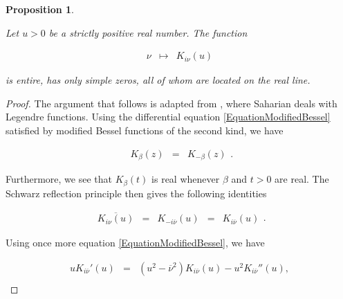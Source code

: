 \documentclass{jams-l}
\newtheorem{proposition}[theorem]{Proposition}
\theoremstyle{definition}
\theoremstyle{remark}
\numberwithin{equation}{section}
\begin{document}
        \begin{proposition}
        \label{PropAppZerosModifiedBessel}
        
            Let $u > 0$ be a strictly positive real number. The function
            
            \[ \begin{array}{lll}
                    \nu & \longmapsto & K_{i \nu} \left( u \right)
                \end{array} \]
            
            \noindent is entire, has only simple zeros, all of whom are located on the real line.
        
        \end{proposition}
        
        \begin{proof}
        
            The argument that follows is adapted from \cite[Appendix A]{MR2439244}, where Saharian deals with  Legendre functions. Using the differential equation \ref{EquationModifiedBessel} satisfied by modified Bessel functions of the second kind, we have
            
            \[ \begin{array}{lll}
                    K_{\beta} \left( z \right) & = & K_{- \beta} \left( z \right)
                \end{array} . \]
            
            \noindent Furthermore, we see that $K_{\beta} \left( t \right)$ is real whenever $\beta$ and $t > 0$ are real. The Schwarz reflection principle then gives the following identities
            
            \[ \begin{array}{lllll}
                    \overline{K_{i \nu} \left( u \right)} & = & K_{- i \overline{\nu}} \left( u \right) & = & K_{i \overline{\nu}} \left( u \right)
                \end{array} . \]
            
            \noindent Using once more equation \ref{EquationModifiedBessel}, we have
            
            \[ \begin{array}{lll}
                    u K_{i \overline{\nu}}' \left( u \right) & = & \left( u^2 - \overline{\nu}^2 \right) K_{i \overline{\nu}} \left( u \right) - u^2 K_{i \overline{\nu}}'' \left( u \right), \\[0.5em]
                    

\end{array}\]
\end{proof}
\end{document}
